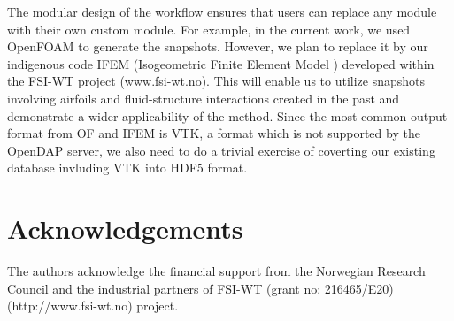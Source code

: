 \documentclass[3p,times,procedia]{elsarticle}
\begin{document}
The modular design of the workflow ensures that users can replace any module
with their own custom module. For example, in the current work, we used OpenFOAM
to generate the snapshots. However, we plan to replace it by our indigenous code
IFEM (Isogeometric Finite Element Model \cite{vanOpstal2015imc}) developed
within the FSI-WT project (www.fsi-wt.no). This will enable us to utilize
snapshots involving airfoils \cite{Nordanger2015ict,Nordanger2015sap} and
fluid-structure interactions \cite{Nordanger2015nbf} created in the past and
demonstrate a wider applicability of the method. Since the most common output
format from OF and IFEM is VTK, a format which is not supported by the OpenDAP
server, we also need to do a trivial exercise of coverting our existing database
invluding VTK into HDF5 format.

\section*{Acknowledgements}

The authors acknowledge the financial support from the Norwegian Research Council and the industrial partners of FSI-WT (grant no: 216465/E20) (http://www.fsi-wt.no) project.

\vspace*{-3pt}
\vspace*{-3pt}



\end{document}
